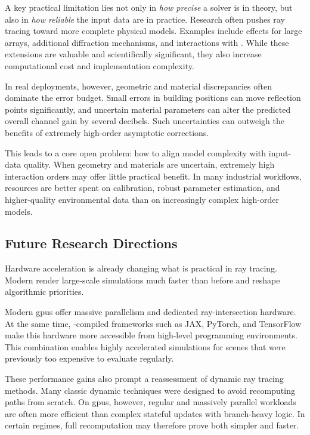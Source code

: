 A key practical limitation lies not only in \emph{how precise} a solver is in theory, but also in \emph{how reliable} the input data are in practice. Research often pushes ray tracing toward more complete physical models. Examples include  effects for large arrays, additional diffraction mechanisms, and interactions with . While these extensions are valuable and scientifically significant, they also increase computational cost and implementation complexity.

In real deployments, however, geometric and material discrepancies often dominate the error budget. Small errors in building positions can move reflection points significantly, and uncertain material parameters can alter the predicted overall channel gain by several decibels. Such uncertainties can outweigh the benefits of extremely high-order asymptotic corrections.

This leads to a core open problem: how to align model complexity with input-data quality. When geometry and materials are uncertain, extremely high interaction orders may offer little practical benefit. In many industrial workflows, resources are better spent on calibration, robust parameter estimation, and higher-quality environmental data than on increasingly complex high-order models.

\subsection{Future Research Directions}

Hardware acceleration is already changing what is practical in ray tracing. Modern  render large-scale simulations much faster than before and reshape algorithmic priorities.

Modern \glspl{gpu} offer massive parallelism and dedicated ray-intersection hardware. At the same time, -compiled frameworks such as JAX, PyTorch, and TensorFlow make this hardware more accessible from high-level programming environments. This combination enables highly accelerated simulations for scenes that were previously too expensive to evaluate regularly.

These performance gains also prompt a reassessment of dynamic ray tracing methods. Many classic dynamic techniques were designed to avoid recomputing paths from scratch. On \glspl{gpu}, however, regular and massively parallel workloads are often more efficient than complex stateful updates with branch-heavy logic. In certain regimes, full recomputation may therefore prove both simpler and faster.


